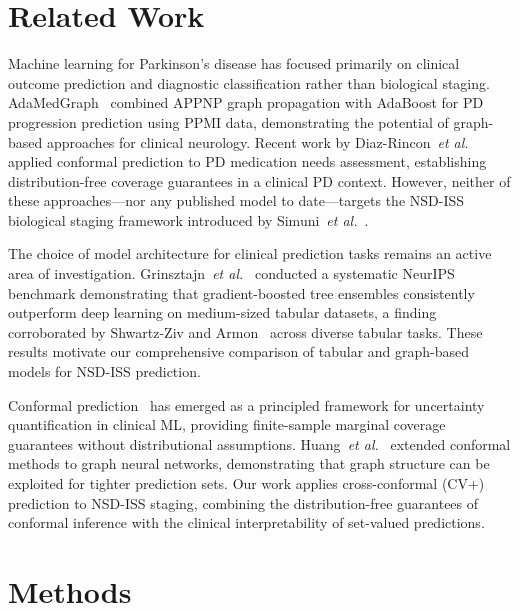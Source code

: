 \section{Related Work}
\label{p1:sec:related}

Machine learning for Parkinson's disease has focused primarily on clinical outcome prediction and diagnostic classification rather than biological staging. AdaMedGraph~\cite{adamedgraph} combined APPNP graph propagation with AdaBoost for PD progression prediction using PPMI data, demonstrating the potential of graph-based approaches for clinical neurology. Recent work by Diaz-Rincon~\textit{et al.}~\cite{diazrincon2025} applied conformal prediction to PD medication needs assessment, establishing distribution-free coverage guarantees in a clinical PD context. However, neither of these approaches---nor any published model to date---targets the NSD-ISS biological staging framework introduced by Simuni~\textit{et al.}~\cite{simuni2024}.

The choice of model architecture for clinical prediction tasks remains an active area of investigation. Grinsztajn~\textit{et al.}~\cite{grinsztajn2022} conducted a systematic NeurIPS benchmark demonstrating that gradient-boosted tree ensembles consistently outperform deep learning on medium-sized tabular datasets, a finding corroborated by Shwartz-Ziv and Armon~\cite{shwartzziv2022} across diverse tabular tasks. These results motivate our comprehensive comparison of tabular and graph-based models for NSD-ISS prediction.

Conformal prediction~\cite{vovk2022} has emerged as a principled framework for uncertainty quantification in clinical ML, providing finite-sample marginal coverage guarantees without distributional assumptions. Huang~\textit{et al.}~\cite{huang2023} extended conformal methods to graph neural networks, demonstrating that graph structure can be exploited for tighter prediction sets. Our work applies cross-conformal (CV+) prediction to NSD-ISS staging, combining the distribution-free guarantees of conformal inference with the clinical interpretability of set-valued predictions.

\section{Methods}
\label{p1:sec:methods}

